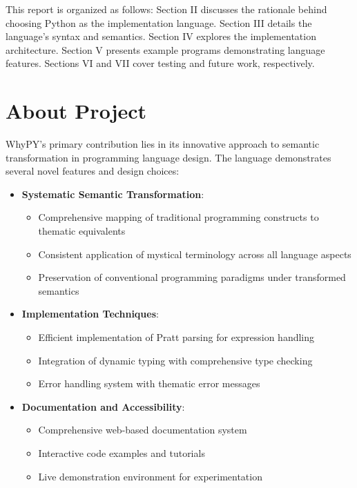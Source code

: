 \documentclass[11pt]{article}
\begin{document}
This report is organized as follows: Section II discusses the rationale behind choosing Python as the implementation language. Section III details the language's syntax and semantics. Section IV explores the implementation architecture. Section V presents example programs demonstrating language features. Sections VI and VII cover testing and future work, respectively.

\section{About Project}
WhyPY's primary contribution lies in its innovative approach to semantic transformation in programming language design. The language demonstrates several novel features and design choices:

\begin{itemize}
    \item \textbf{Systematic Semantic Transformation}: 
    \begin{itemize}
        \item Comprehensive mapping of traditional programming constructs to thematic equivalents
        \item Consistent application of mystical terminology across all language aspects
        \item Preservation of conventional programming paradigms under transformed semantics
    \end{itemize}
    
    \item \textbf{Implementation Techniques}:
    \begin{itemize}
        \item Efficient implementation of Pratt parsing for expression handling
        \item Integration of dynamic typing with comprehensive type checking
        \item Error handling system with thematic error messages
    \end{itemize}
    
    \item \textbf{Documentation and Accessibility}:
    \begin{itemize}
        \item Comprehensive web-based documentation system
        \item Interactive code examples and tutorials
        \item Live demonstration environment for experimentation
    \end{itemize}
\end{itemize}
\end{document}
